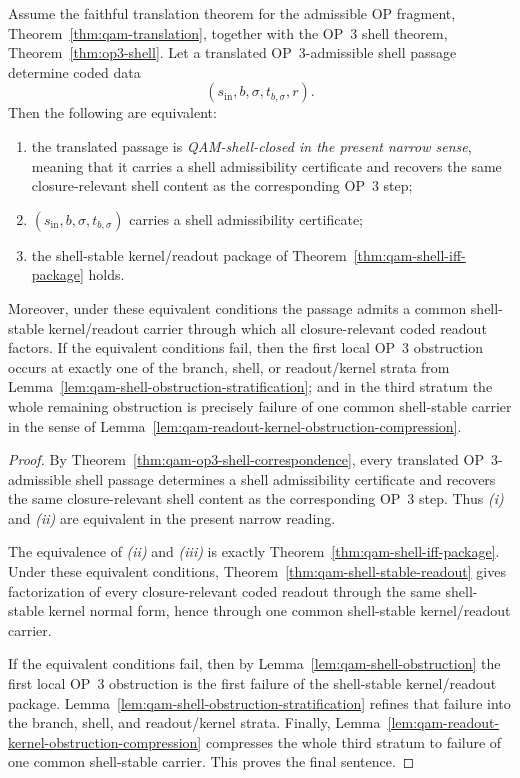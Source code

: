 \begin{theorem}\label{thm:qam-op3-shell-closure}
Assume the faithful translation theorem for the admissible OP fragment, Theorem~\ref{thm:qam-translation}, together with the OP~3 shell theorem, Theorem~\ref{thm:op3-shell}. Let a translated OP~3-admissible shell passage determine coded data
\[
(s_{\mathrm{in}},b,\sigma,t_{b,\sigma},r).
\]
Then the following are equivalent:
\begin{enumerate}[leftmargin=2em,label=(\roman*)]
 \item the translated passage is \emph{QAM-shell-closed in the present narrow sense}, meaning that it carries a shell admissibility certificate and recovers the same closure-relevant shell content as the corresponding OP~3 step;
 \item $(s_{\mathrm{in}},b,\sigma,t_{b,\sigma})$ carries a shell admissibility certificate;
 \item the shell-stable kernel/readout package of Theorem~\ref{thm:qam-shell-iff-package} holds.
\end{enumerate}
Moreover, under these equivalent conditions the passage admits a common shell-stable kernel/readout carrier through which all closure-relevant coded readout factors. If the equivalent conditions fail, then the first local OP~3 obstruction occurs at exactly one of the branch, shell, or readout/kernel strata from Lemma~\ref{lem:qam-shell-obstruction-stratification}; and in the third stratum the whole remaining obstruction is precisely failure of one common shell-stable carrier in the sense of Lemma~\ref{lem:qam-readout-kernel-obstruction-compression}.
\end{theorem}

\begin{proof}
By Theorem~\ref{thm:qam-op3-shell-correspondence}, every translated OP~3-admissible shell passage determines a shell admissibility certificate and recovers the same closure-relevant shell content as the corresponding OP~3 step. Thus \emph{(i)} and \emph{(ii)} are equivalent in the present narrow reading.

The equivalence of \emph{(ii)} and \emph{(iii)} is exactly Theorem~\ref{thm:qam-shell-iff-package}. Under these equivalent conditions, Theorem~\ref{thm:qam-shell-stable-readout} gives factorization of every closure-relevant coded readout through the same shell-stable kernel normal form, hence through one common shell-stable kernel/readout carrier.

If the equivalent conditions fail, then by Lemma~\ref{lem:qam-shell-obstruction} the first local OP~3 obstruction is the first failure of the shell-stable kernel/readout package. Lemma~\ref{lem:qam-shell-obstruction-stratification} refines that failure into the branch, shell, and readout/kernel strata. Finally, Lemma~\ref{lem:qam-readout-kernel-obstruction-compression} compresses the whole third stratum to failure of one common shell-stable carrier. This proves the final sentence.
\end{proof}

